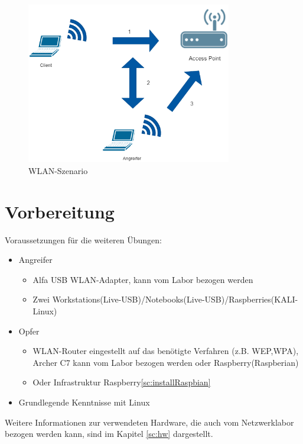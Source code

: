 \begin{figure}[H]
	\centering
	\includegraphics[width=0.8\textwidth]{images/WLAN/WLANSzenario.png}
	\caption{WLAN-Szenario}
	\label{fig:WLAN-Szenario}
\end{figure}

\section{Vorbereitung}

Voraussetzungen für die weiteren Übungen:

\begin{itemize}
	\item Angreifer\begin{itemize}
	\item Alfa USB WLAN-Adapter, kann vom Labor bezogen werden%
    \item Zwei Workstations(Live-USB)/Notebooks(Live-USB)/Raspberries(KALI-Linux)
    \end{itemize}
    \item Opfer\begin{itemize}
	\item WLAN-Router eingestellt auf das benötigte Verfahren (z.B. WEP,WPA), Archer C7 kann vom Labor bezogen werden oder Raspberry(Raspberian)
    \item Oder Infrastruktur Raspberry\ref{sc:installRaspbian}
    \end{itemize}
	\item Grundlegende Kenntnisse mit Linux
\end{itemize}
Weitere Informationen zur verwendeten Hardware, die auch vom Netzwerklabor bezogen werden kann, sind im Kapitel \ref{sc:hw}  dargestellt. 


